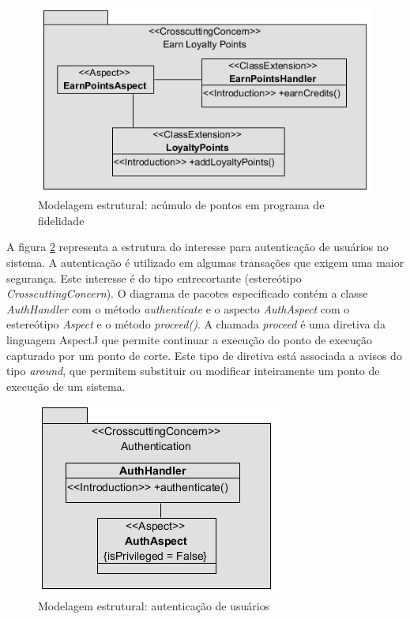   \begin{figure}[!h]
	\centering
	\includegraphics[scale=0.8]{img/case_study_structural_earn_points.png}
	\caption{Modelagem estrutural: acúmulo de pontos em programa de fidelidade}\label{fig:case_study_structural_earn_points}
  \end{figure}
  
A figura \ref{fig:case_study_structural_authentication} representa a estrutura do interesse para autenticação de usuários no sistema. A autenticação é
utilizado em algumas transações que exigem uma maior segurança. Este interesse é do tipo entrecortante (estereótipo \textit{CrosscuttingConcern}). O
diagrama de pacotes especificado contém a classe \textit{AuthHandler} com o método \textit{authenticate} e o aspecto \textit{AuthAspect} com o
estereótipo \textit{Aspect} e o método \textit{proceed()}. A chamada \textit{proceed} é uma diretiva da linguagem AspectJ que permite continuar a
execução do ponto de execução capturado por um ponto de corte. Este tipo de diretiva está associada a avisos do tipo \textit{around}, que permitem
substituir ou modificar inteiramente um ponto de execução de um sistema. 

  \begin{figure}[!h]
	\centering
	\includegraphics{img/case_study_structural_authentication.png}
	\caption{Modelagem estrutural: autenticação de usuários}\label{fig:case_study_structural_authentication}
  \end{figure}

